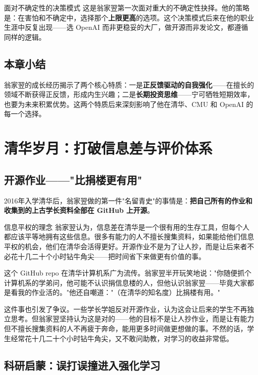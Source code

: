 \documentclass[a4paper]{article}
\begin{document}
\begin{warningbox}{面对不确定性的决策模式}
这是翁家翌第一次面对重大的不确定性抉择。他的策略是：在害怕和不确定中，选择那个\textbf{上限更高}的选项。这个决策模式后来在他的职业生涯中反复出现——选 OpenAI 而非更稳妥的大厂，做开源而非发论文，都遵循同样的逻辑。
\end{warningbox}

\subsection{本章小结}

翁家翌的成长经历揭示了两个核心特质：一是\textbf{正反馈驱动的自我强化}——在擅长的领域不断获得正反馈，形成内生兴趣；二是\textbf{长期投资思维}——宁可牺牲短期效率，也要为未来积累优势。这两个特质后来深刻影响了他在清华、CMU 和 OpenAI 的每一个选择。


\section{清华岁月：打破信息差与评价体系}

\subsection{开源作业——"比捐楼更有用"}

2016年入学清华后，翁家翌做的第一件"名留青史"的事情是：\textbf{把自己所有的作业和收集到的上古学长资料全部在 GitHub 上开源}。

\begin{importantbox}{信息平权的理念}
翁家翌认为，信息差在清华是一个很有用的生存工具，但每个人都应该平等地拥有这些信息。很多有能力的人不擅长搜集资料，如果能给他们信息平权的机会，他们在清华会活得更好。开源作业不是为了让人抄，而是让后来者不必花十几二十个小时钻牛角尖——把时间省下来做更有价值的事。
\end{importantbox}

这个 GitHub repo 在清华计算机系广为流传。翁家翌半开玩笑地说："你随便抓个计算机系的学弟问，他可能不认识捐信息楼的人，但他认识翁家翌——毕竟大家都是看我的作业活的。"他还自嘲道："（在清华的知名度）比捐楼有用。"

这件事也引发了争议。一些学长学姐反对开源作业，认为这会让后来的学生不再独立思考。但翁家翌坚持认为这是对的——他的目标不是让人抄作业，而是让有能力但不擅长搜集资料的人不再疲于奔命，能用更多时间做更想做的事。不然的话，学生经常花十几二十个小时钻牛角尖，又不敢问助教，对学习的收益非常低。

\subsection{科研启蒙：误打误撞进入强化学习}
\end{document}
